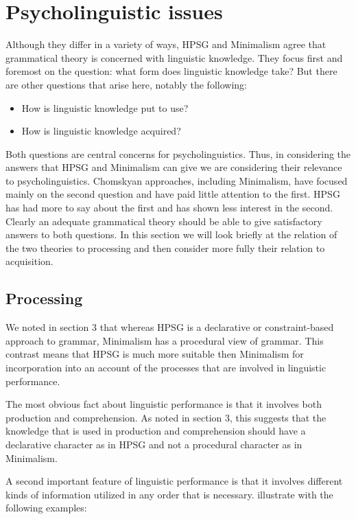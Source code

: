 \documentclass[output=paper]{langsci/langscibook}
\begin{document}
\section{Psycholinguistic issues}


Although they differ in a variety of ways, HPSG and Minimalism agree that grammatical theory is
concerned with linguistic knowledge. They focus first and foremost on the question: what form does
linguistic knowledge take? But there are other questions that arise here, notably the following: 

\begin{itemize}
\item How is linguistic knowledge put to use? 
\item How is linguistic knowledge acquired?
\end{itemize}

Both questions are central concerns for psycholinguistics. Thus, in considering the answers that
HPSG and Minimalism can give we are considering their relevance to psycholinguistics. Chomskyan
approaches, including Minimalism, have focused mainly on the second question and have paid little
attention to the first. HPSG has had more to say about the first and has shown less interest in the
second. Clearly an adequate grammatical theory should be able to give satisfactory answers to both
questions. In this section we will look briefly at the relation of the two theories to processing
and then consider more fully their relation to acquisition.


\subsection{Processing}
\label{sec-minimalism-processing}

We noted in section 3 that whereas HPSG is a declarative or constraint-based approach to grammar,
Minimalism has a procedural view of grammar. This contrast means that HPSG is much more suitable
then Minimalism for incorporation into an account of the processes that are involved in linguistic
performance.

	The most obvious fact about linguistic performance is that it involves both production and comprehension. As noted in section 3, this suggests that the knowledge that is used in production and comprehension should have a declarative character as in HPSG and not a procedural character as in Minimalism. 

A second important feature of linguistic performance is that it involves different kinds of
information utilized in any order that is necessary. \citet{SW2011a} illustrate with the
following examples: 
\end{document}
